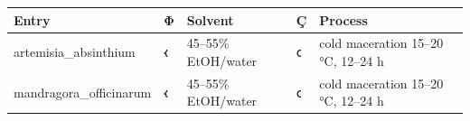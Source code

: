 \begin{longtable}[]{@{}lllll@{}}
\toprule
\begin{minipage}[b]{0.17\columnwidth}\raggedright
Entry\strut
\end{minipage} & \begin{minipage}[b]{0.17\columnwidth}\raggedright
Φ\strut
\end{minipage} & \begin{minipage}[b]{0.17\columnwidth}\raggedright
Solvent\strut
\end{minipage} & \begin{minipage}[b]{0.17\columnwidth}\raggedright
Ç\strut
\end{minipage} & \begin{minipage}[b]{0.17\columnwidth}\raggedright
Process\strut
\end{minipage}\tabularnewline
\midrule
\endhead
\begin{minipage}[t]{0.17\columnwidth}\raggedright
artemisia\_absinthium\strut
\end{minipage} & \begin{minipage}[t]{0.17\columnwidth}\raggedright
𐑬\strut
\end{minipage} & \begin{minipage}[t]{0.17\columnwidth}\raggedright
45--55\% EtOH/water\strut
\end{minipage} & \begin{minipage}[t]{0.17\columnwidth}\raggedright
𐑤\strut
\end{minipage} & \begin{minipage}[t]{0.17\columnwidth}\raggedright
cold maceration 15--20 °C, 12--24 h\strut
\end{minipage}\tabularnewline
\begin{minipage}[t]{0.17\columnwidth}\raggedright
mandragora\_officinarum\strut
\end{minipage} & \begin{minipage}[t]{0.17\columnwidth}\raggedright
𐑬\strut
\end{minipage} & \begin{minipage}[t]{0.17\columnwidth}\raggedright
45--55\% EtOH/water\strut
\end{minipage} & \begin{minipage}[t]{0.17\columnwidth}\raggedright
𐑤\strut
\end{minipage} & \begin{minipage}[t]{0.17\columnwidth}\raggedright
cold maceration 15--20 °C, 12--24 h\strut
\end{minipage}\tabularnewline

\end{longtable}
